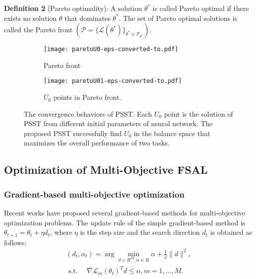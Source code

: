 \documentclass[final]{cvpr}
\begin{document}
\textbf{Definition 2} (Pareto optimality): A solution $\theta^{*}$ is called Pareto optimal if there exists no solution $\theta$ that dominates $\theta^{*}$.
The set of Pareto optimal solutions is called the Pareto front $\left(\mathcal{P}=\{\mathcal{L}(\theta^{*})\}_{{\theta^{*}} \in \mathcal{P}_{\theta^{*}}}\right)$. 

\begin{figure}
	\centering
	\begin{subfigure}{0.46\linewidth}
		\texttt{[image: paretoU0-eps-converted-to.pdf]}\label{common}
		\caption{Pareto front }
	\end{subfigure}
	\begin{subfigure}{0.46\linewidth}
 
		\texttt{[image: paretoU01-eps-converted-to.pdf]}\label{private}
		\caption{$U_0$ points in Pareto front.}
	\end{subfigure}
	\caption{The convergence behaviors of PSST. Each $U_0$ point is the solution of PSST from different initial parameters of neural network.
		The proposed PSST successfully find $U_0$ in the balance space that maximizes the overall performance of two tasks. }\label{figconvergence}
\end{figure}

\subsection{Optimization of Multi-Objective FSAL}
\subsubsection{Gradient-based multi-objective optimization}

 
Recent works have proposed several gradient-based methods \cite{FliegeV16,LinZ0ZK19} for multi-objective optimization problems. 
The update rule of the simple gradient-based method \cite{fliege2000steepest} is $\theta_{t+1}=\theta_{t}+\eta d_{t}$, where $\eta$ is the step size and the search direction $d_{t}$ is obtained as follows:
\begin{equation}\label{eqP}
	\begin{array}{c} \left(d_{t}, \alpha_{t}\right)=\arg \min _{d \in R^{M}, \alpha \in R} \alpha+\frac{1}{2}\|d\|^{2}, \\ \text { s.t. } \quad \nabla \mathcal{L}_{m}\left(\theta_{t}\right)^{T} d \leq \alpha, m=1, \ldots, M. \end{array}
\end{equation}
\end{document}
